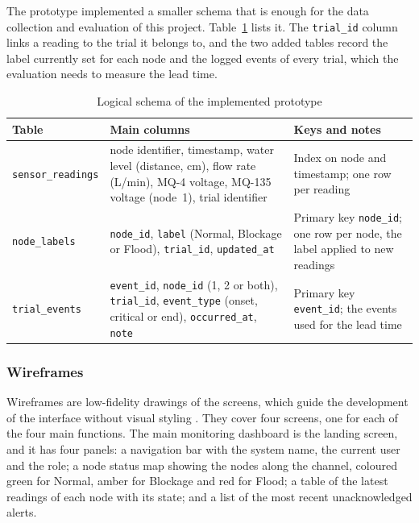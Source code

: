 \documentclass[12pt, a4paper]{article}
\begin{document}
The prototype implemented a smaller schema that is enough for the data collection and evaluation of this project. Table~\ref{tab:schema-built} lists it. The \texttt{trial\_id} column links a reading to the trial it belongs to, and the two added tables record the label currently set for each node and the logged events of every trial, which the evaluation needs to measure the lead time.

\begin{table}[H]
\centering

\begin{tabular}{|p{2.8cm}|p{5.6cm}|p{4.8cm}|}
\hline
\textbf{Table} & \textbf{Main columns} & \textbf{Keys and notes} \\
\hline
\texttt{sensor\_readings} & node identifier, timestamp, water level (distance, cm), flow rate (L/min), MQ-4 voltage, MQ-135 voltage (node~1), trial identifier & Index on node and timestamp; one row per reading \\
\hline
\texttt{node\_labels} & \texttt{node\_id}, \texttt{label} (Normal, Blockage or Flood), \texttt{trial\_id}, \texttt{updated\_at} & Primary key \texttt{node\_id}; one row per node, the label applied to new readings \\
\hline
\texttt{trial\_events} & \texttt{event\_id}, \texttt{node\_id} (1, 2 or both), \texttt{trial\_id}, \texttt{event\_type} (onset, critical or end), \texttt{occurred\_at}, \texttt{note} & Primary key \texttt{event\_id}; the events used for the lead time \\
\hline
\end{tabular}
\caption{Logical schema of the implemented prototype}
\label{tab:schema-built}
\end{table}

\subsubsection{Wireframes}

Wireframes are low-fidelity drawings of the screens, which guide the development of the interface without visual styling \citep{garrett2011}. They cover four screens, one for each of the four main functions. The main monitoring dashboard is the landing screen, and it has four panels: a navigation bar with the system name, the current user and the role; a node status map showing the nodes along the channel, coloured green for Normal, amber for Blockage and red for Flood; a table of the latest readings of each node with its state; and a list of the most recent unacknowledged alerts.
\end{document}
